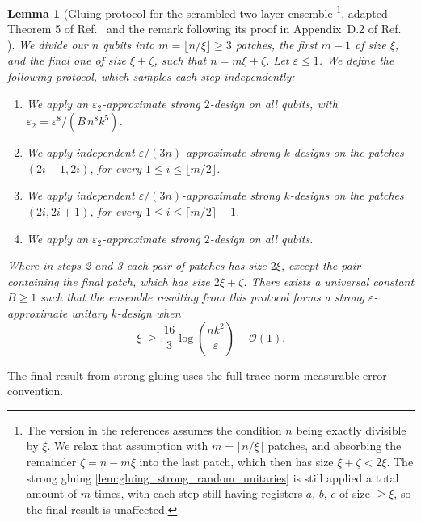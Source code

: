 \documentclass[
    aps,
    superscriptaddress,
    onecolumn,
    10pt,
    prx,
    nofootinbib
]{revtex4-2}
\newtheorem{lemma}{Lemma}
\theoremstyle{namedstatement}
\theoremstyle{plain}
\begin{document}
\begin{lemma}[Gluing protocol for the scrambled two-layer ensemble \footnote{The version in the references assumes the condition $n$ being exactly divisible by $\xi$. We relax that assumption with $m = \lfloor n/\xi \rfloor$ patches, and absorbing the remainder $\zeta = n - m\xi$ into the last patch, which
then has size $\xi + \zeta < 2\xi$. The strong gluing \cref{lem:gluing_strong_random_unitaries} is still applied a total amount of $m$ times, with each step still having registers $a$, $b$, $c$ of size $\geq \xi$, so the final result is unaffected.}, adapted Theorem 5 of Ref.~\cite{SchusterEtAlStrong2025} and the remark following its proof in Appendix~D.2 of Ref.~\cite{SchusterEtAlStrong2025} ]
\label{lem:patch_protocol}
We divide our $n$ qubits into $m=\lfloor n/\xi \rfloor \geq 3$  patches, the first $m-1$ of size $\xi$, and the final one of size $\xi+\zeta$, such that $n=m\xi+\zeta$. Let $\varepsilon \leq 1$. We define the following protocol, which samples each step independently:
\begin{enumerate}
    \item We apply an $\varepsilon_2$-approximate strong $2$-design on all qubits,  with $\varepsilon_2 = \varepsilon^{8}/(B\, n^{8} k^{5})$.
    \item We apply independent $\varepsilon/(3n)$-approximate strong $k$-designs on the
          patches $(2i-1,2i)$, for every $1\leq i\leq\lfloor m/2 \rfloor$.
    \item We apply independent $\varepsilon/(3n)$-approximate strong $k$-designs on the
          patches $(2i,2i+1)$, for every $1\leq i\leq \lceil m/2 \rceil-1$.
    \item We apply an $\varepsilon_2$-approximate strong $2$-design on all qubits.
\end{enumerate} Where in steps 2 and 3 each pair of patches has size $2\xi$, except the pair containing the
final patch, which has size $2\xi + \zeta$.
There exists a universal constant $B\geq 1$ such that the ensemble resulting from this protocol forms a strong
$\varepsilon$-approximate unitary $k$-design when
\begin{equation}
    \xi
    \;\geq\;
    \frac{16}{3}
    \log\!\left(\frac{nk^{2}}{\varepsilon}\right)
    +
    \mathcal{O}(1).
    \label{eq:patch_size_ew}
\end{equation}

\end{lemma}

The final result from strong gluing uses the full trace-norm measurable-error convention.
\end{document}
